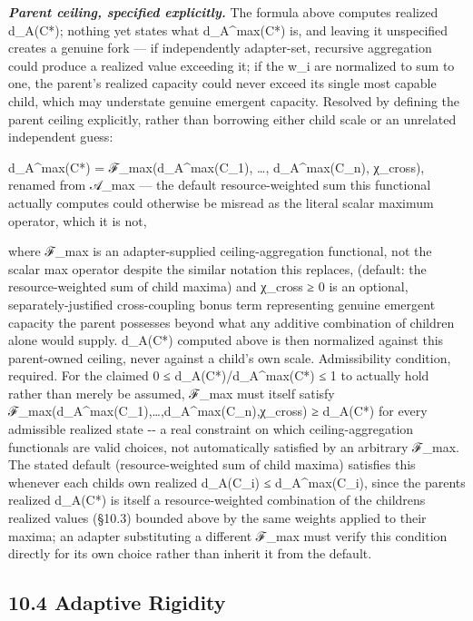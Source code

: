 \documentclass[
]{article}
\begin{document}
\emph{\textbf{Parent ceiling, specified explicitly.}} The formula above
computes realized d\_A(C*); nothing yet states what d\_A\^{}max(C*) is,
and leaving it unspecified creates a genuine fork --- if independently
adapter-set, recursive aggregation could produce a realized value
exceeding it; if the w\_i are normalized to sum to one, the parent's
realized capacity could never exceed its single most capable child,
which may understate genuine emergent capacity. Resolved by defining the
parent ceiling explicitly, rather than borrowing either child scale or
an unrelated independent guess:

d\_A\^{}max(C*) = ℱ\_max(d\_A\^{}max(C\_1), \ldots, d\_A\^{}max(C\_n),
χ\_cross), renamed from 𝒜\_max --- the default resource-weighted sum
this functional actually computes could otherwise be misread as the
literal scalar maximum operator, which it is not,

where ℱ\_max is an adapter-supplied ceiling-aggregation functional, not
the scalar max operator despite the similar notation this replaces,
(default: the resource-weighted sum of child maxima) and χ\_cross ≥ 0 is
an optional, separately-justified cross-coupling bonus term representing
genuine emergent capacity the parent possesses beyond what any additive
combination of children alone would supply. d\_A(C*) computed above is
then normalized against this parent-owned ceiling, never against a
child's own scale. Admissibility condition, required. For the claimed 0
≤ d\_A(C*)/d\_A\^{}max(C*) ≤ 1 to actually hold rather than merely be
assumed, ℱ\_max must itself satisfy
ℱ\_max(d\_A\^{}max(C\_1),\ldots,d\_A\^{}max(C\_n),χ\_cross) ≥ d\_A(C*)
for every admissible realized state -\/- a real constraint on which
ceiling-aggregation functionals are valid choices, not automatically
satisfied by an arbitrary ℱ\_max. The stated default (resource-weighted
sum of child maxima) satisfies this whenever each
child\textquotesingle s own realized d\_A(C\_i) ≤ d\_A\^{}max(C\_i),
since the parent\textquotesingle s realized d\_A(C*) is itself a
resource-weighted combination of the children\textquotesingle s realized
values (§10.3) bounded above by the same weights applied to their
maxima; an adapter substituting a different ℱ\_max must verify this
condition directly for its own choice rather than inherit it from the
default.

\hypertarget{adaptive-rigidity}{%
\subsection{10.4 Adaptive Rigidity}\label{adaptive-rigidity}}
\end{document}

